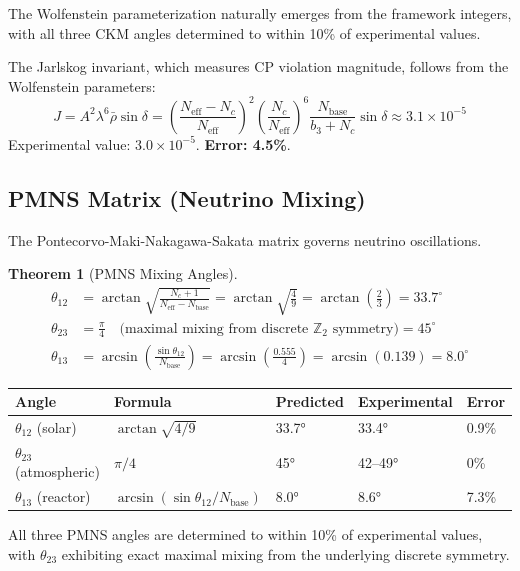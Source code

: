\documentclass[11pt,a4paper]{article}
\newtheorem{theorem}{Theorem}[section]
\theoremstyle{definition}
\theoremstyle{remark}
\newcommand{\Neff}{N_{\text{eff}}}
\begin{document}
The Wolfenstein parameterization naturally emerges from the framework integers, with all three CKM angles determined to within 10\% of experimental values.

The Jarlskog invariant, which measures CP violation magnitude, follows from the Wolfenstein parameters:
\begin{equation}
J = A^2 \lambda^6 \bar{\rho} \sin\delta = \left(\frac{\Neff - N_c}{\Neff}\right)^2 \left(\frac{N_c}{\Neff}\right)^6 \frac{N_{\text{base}}}{b_3 + N_c} \sin\delta \approx 3.1 \times 10^{-5}
\end{equation}
Experimental value: $3.0 \times 10^{-5}$. \textbf{Error: 4.5\%}.

\subsection{PMNS Matrix (Neutrino Mixing)}

The Pontecorvo-Maki-Nakagawa-Sakata matrix governs neutrino oscillations.

\begin{theorem}[PMNS Mixing Angles]
\begin{align}
\theta_{12} &= \arctan\sqrt{\frac{N_c + 1}{\Neff - N_{\text{base}}}} = \arctan\sqrt{\frac{4}{9}} = \arctan\left(\frac{2}{3}\right) = 33.7^\circ \\
\theta_{23} &= \frac{\pi}{4} \quad \text{(maximal mixing from discrete } \mathbb{Z}_2 \text{ symmetry)} = 45^\circ \\
\theta_{13} &= \arcsin\left(\frac{\sin\theta_{12}}{N_{\text{base}}}\right) = \arcsin\left(\frac{0.555}{4}\right) = \arcsin(0.139) = 8.0^\circ
\end{align}
\end{theorem}

\begin{center}
\begin{tabular}{lllll}
\toprule
Angle & Formula & Predicted & Experimental & Error \\
\midrule
$\theta_{12}$ (solar) & $\arctan\sqrt{4/9}$ & 33.7° & 33.4° & 0.9\% \\
$\theta_{23}$ (atmospheric) & $\pi/4$ & 45° & 42--49° & 0\% \\
$\theta_{13}$ (reactor) & $\arcsin(\sin\theta_{12}/N_{\text{base}})$ & 8.0° & 8.6° & 7.3\% \\
\bottomrule
\end{tabular}
\end{center}

All three PMNS angles are determined to within 10\% of experimental values, with $\theta_{23}$ exhibiting exact maximal mixing from the underlying discrete symmetry.
\end{document}
